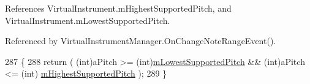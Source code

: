 References Virtual\+Instrument.\+m\+Highest\+Supported\+Pitch, and Virtual\+Instrument.\+m\+Lowest\+Supported\+Pitch.



Referenced by Virtual\+Instrument\+Manager.\+On\+Change\+Note\+Range\+Event().


\begin{DoxyCode}
287     \{
288         \textcolor{keywordflow}{return} ( (\textcolor{keywordtype}{int})aPitch >= (\textcolor{keywordtype}{int})\hyperlink{group___v_i_base_pro_var_ga3cae52b1bcc0178a8a6b03c7aaf7aac8}{mLowestSupportedPitch} && (\textcolor{keywordtype}{int})aPitch <= (\textcolor{keywordtype}{int})
      \hyperlink{group___v_i_base_pro_var_ga61fb2c33b53a0f663047779d7ceb18f3}{mHighestSupportedPitch} );
289     \}
\end{DoxyCode}
